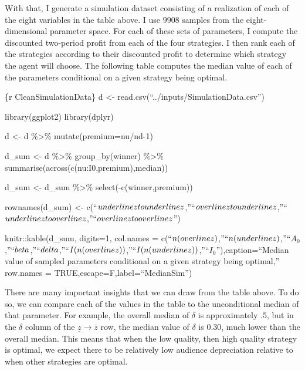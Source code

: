 \documentclass[
]{article}
\begin{document}
With that, I generate a simulation dataset consisting of a realization
of each of the eight variables in the table above. I use \(9908\)
samples from the eight-dimensional parameter space. For each of these
sets of parameters, I compute the discounted two-period profit from each
of the four strategies. I then rank each of the strategies according to
their discounted profit to determine which strategy the agent will
choose. The following table computes the median value of each of the
parameters conditional on a given strategy being optimal.

\{r CleanSimulationData\} d \textless-
read.csv(``../inputs/SimulationData.csv'')

library(ggplot2) library(dplyr)

d \textless- d \%\textgreater\% mutate(premium=nu/nd-1)

d\_sum \textless- d \%\textgreater\% group\_by(winner) \%\textgreater\%
summarise(across(c(nu:I0,premium),median))

d\_sum \textless- d\_sum \%\textgreater\% select(-c(winner,premium))

rownames(d\_sum) \textless-
c(``\(\\underline{z}\\to\\underline{z}\),''``\(\\overline{z}\\to\\underline{z}\),''``\(\\underline{z}\\to\\overline{z}\),''``\(\\overline{z}\\to\\overline{z}\)'')

knitr::kable(d\_sum, digits=1, col.names =
c(``\(n(\\overline{z})\),''``\(n(\\underline{z})\),''``\(A_0\),''``\(\\beta\),''``\(\\delta\),''``\(I(n(\\overline{z}))\),''``\(I(n(\\underline{z}))\),''``\(I_0\)''),caption=``Median
value of sampled parameters conditional on a given strategy being
optimal,'' row.names = TRUE,escape=F,label=``MedianSim'')

There are many important insights that we can draw from the table above.
To do so, we can compare each of the values in the table to the
unconditional median of that parameter. For example, the overall median
of \(\delta\) is approximately \(.5\), but in the \(\delta\) column of
the \(\underline{z}\to\overline{z}\) row, the median value of \(\delta\)
is \(0.30\), much lower than the overall median. This means that when
the low quality, then high quality strategy is optimal, we expect there
to be relatively low audience depreciation relative to when other
strategies are optimal.
\end{document}
